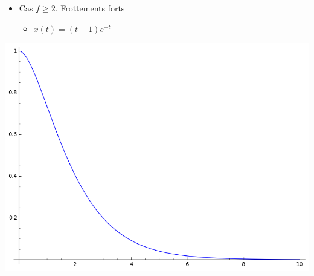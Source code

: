 \begin{frame}
\begin{minipage}{0.7\textwidth}
\begin{itemize}
  \item Cas $f \ge 2$. Frottements forts
  \begin{itemize}
  \pause
    \item $x(t) = (t + 1)e^{-t}$
  \end{itemize}     
\end{itemize}
\end{minipage}\pause
\begin{minipage}{0.29\textwidth}
\includegraphics[scale=0.15]{figures/equadiff-ressort3.png}
\end{minipage}

\end{frame}





